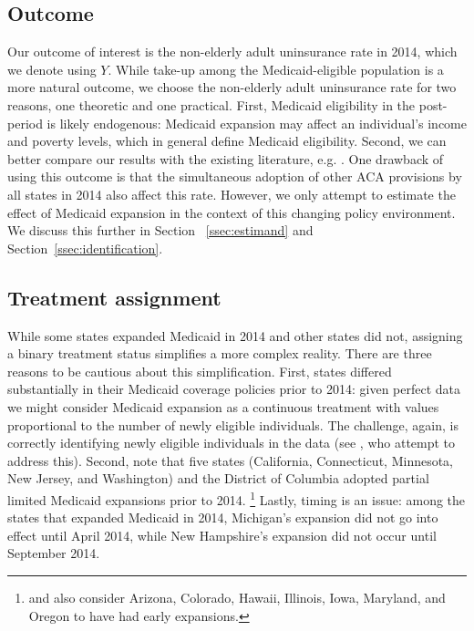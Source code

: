 \documentclass[aoas]{imsart}
\theoremstyle{plain}
\theoremstyle{remark}
\begin{document}
\subsection{Outcome}

Our outcome of interest is the non-elderly adult uninsurance rate in 2014, which we denote using $Y$. While take-up among the Medicaid-eligible population is a more natural outcome, we choose the non-elderly adult uninsurance rate for two reasons, one theoretic and one practical. First, Medicaid eligibility in the post-period is likely endogenous: Medicaid expansion may affect an individual's income and poverty levels, which in general define Medicaid eligibility. Second, we can better compare our results with the existing literature, e.g. \cite{courtemanche2017early}. One drawback of using this outcome is that the simultaneous adoption of other ACA provisions by all states in 2014 also affect this rate. However, we only attempt to estimate the effect of Medicaid expansion in the context of this changing policy environment. We discuss this further in Section ~\ref{ssec:estimand} and Section~\ref{ssec:identification}. 

\subsection{Treatment assignment} \label{sssec:txassign}

While some states expanded Medicaid in 2014 and other states did not, assigning a binary treatment status simplifies a more complex reality. There are three reasons to be cautious about this simplification. First, states differed substantially in their Medicaid coverage policies prior to 2014: given perfect data we might consider Medicaid expansion as a continuous treatment with values proportional to the number of newly eligible individuals. The challenge, again, is correctly identifying newly eligible individuals in the data (see \cite{frean2017premium}, who attempt to address this). Second, \cite{frean2017premium} note that five states (California, Connecticut, Minnesota, New Jersey, and Washington) and the District of Columbia adopted partial limited Medicaid expansions prior to 2014. \footnote{\cite{kaestner2017effects} and \cite{courtemanche2017early} also consider Arizona, Colorado, Hawaii, Illinois, Iowa, Maryland, and Oregon to have had early expansions.} Lastly, timing is an issue: among the states that expanded Medicaid in 2014, Michigan's expansion did not go into effect until April 2014, while New Hampshire's expansion did not occur until September 2014.
\end{document}
